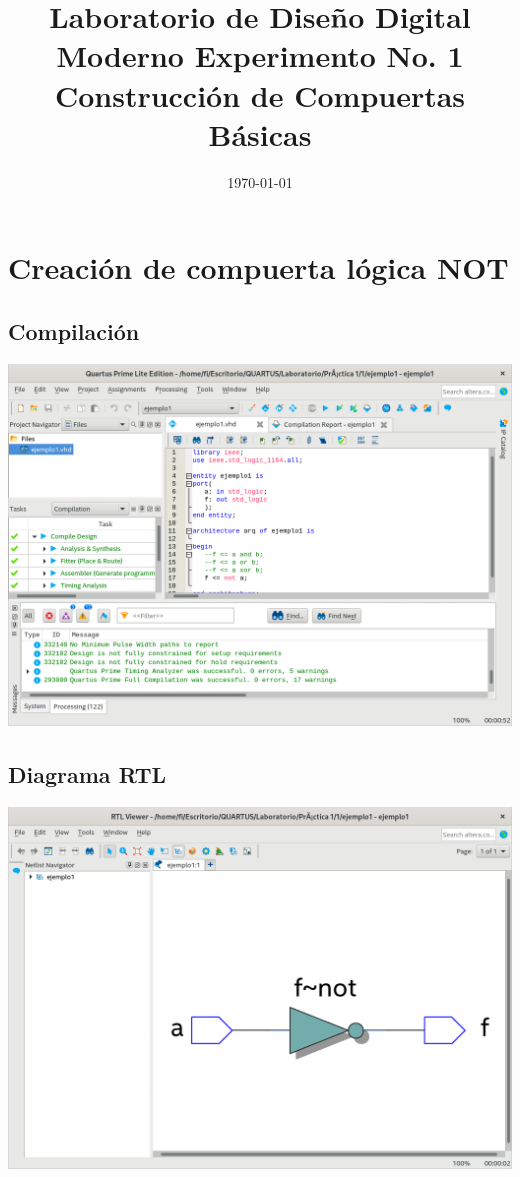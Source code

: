 \documentclass[10pt,a4paper]{article}
\title{Laboratorio de Diseño Digital Moderno Experimento No. 1 Construcción de Compuertas Básicas}
\author{}
\date{\today}
\begin{document}
	\maketitle
	
	\section{Creación de compuerta lógica NOT}
	\subsection{Compilación}
	\begin{center}
		\includegraphics[scale=0.35]{Compilacion1.png}
	\end{center}
	
	\subsection{Diagrama RTL}
	\begin{center}
		\includegraphics[scale=0.35]{RTL1.png}
	\end{center}
\end{document}
